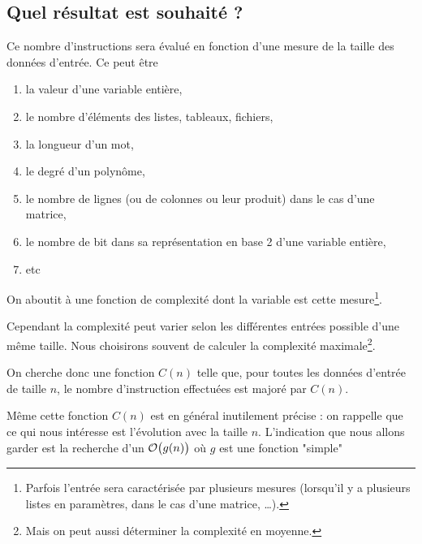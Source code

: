 \subsection{Quel résultat est souhaité ?}
Ce nombre d'instructions sera évalué en fonction d'une mesure de la taille des données d'entrée. Ce peut être

\begin{enumerate}
\item la valeur d'une variable entière,
\item le nombre d'éléments des listes, tableaux, fichiers,
\item la longueur d'un mot,
\item le degré d'un polynôme,
\item le nombre de lignes (ou de colonnes ou leur produit) dans le cas d'une matrice,
\item le nombre de bit dans sa représentation en base 2 d'une variable entière,
\item etc
\end{enumerate}

On aboutit à une fonction de complexité dont la variable est cette mesure\footnote{Parfois l'entrée sera caractérisée par plusieurs mesures (lorsqu'il y a plusieurs listes en paramètres, dans le cas d'une matrice, \dots).}.

\medskip

Cependant la complexité peut varier selon les différentes entrées possible d'une même taille. Nous choisirons souvent de calculer la complexité maximale\footnote{Mais on peut aussi déterminer la complexité en moyenne.}.

On cherche donc une fonction $C(n)$ telle que, pour toutes les données d'entrée de taille $n$, le nombre d'instruction effectuées est majoré par $C(n)$.

\medskip

Même cette fonction $C(n)$ est en général inutilement précise : on rappelle que ce qui nous intéresse est l'évolution avec la taille $n$. L'indication que nous allons garder est la recherche d'un ${\cal O}\bigl(g(n)\bigr)$ où $g$ est une fonction "simple"

